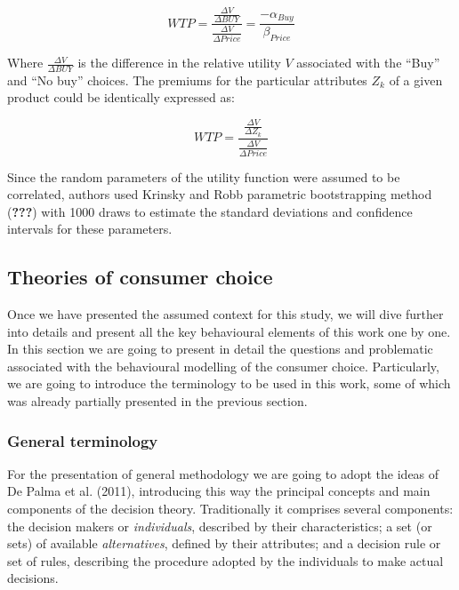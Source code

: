 \documentclass[11pt,]{article}
\begin{document}
\begin{equation}
WTP = \frac{
 \frac{\Delta V}{\Delta BUY}
}{
 \frac{\Delta V}{\Delta Price}
} = \frac{
  - \alpha_{Buy}
}{
  \beta_{Price}
}
\end{equation}

Where \(\frac{\Delta V}{\Delta BUY}\) is the difference in the relative
utility \(V\) associated with the ``Buy'' and ``No buy'' choices. The
premiums for the particular attributes \(Z_k\) of a given product could
be identically expressed as:

\begin{equation}
WTP = \frac{
 \frac{\Delta V}{\Delta Z_k}
}{
 \frac{\Delta V}{\Delta Price}
}
\end{equation}

Since the random parameters of the utility function were assumed to be
correlated, authors used Krinsky and Robb parametric bootstrapping
method ({\textbf{???}}) with 1000 draws to estimate the standard
deviations and confidence intervals for these parameters.

\hypertarget{theories-of-consumer-choice}{%
\subsection{Theories of consumer
choice}\label{theories-of-consumer-choice}}

Once we have presented the assumed context for this study, we will dive
further into details and present all the key behavioural elements of
this work one by one. In this section we are going to present in detail
the questions and problematic associated with the behavioural modelling
of the consumer choice. Particularly, we are going to introduce the
terminology to be used in this work, some of which was already partially
presented in the previous section.

\hypertarget{general-terminology}{%
\subsubsection{General terminology}\label{general-terminology}}

For the presentation of general methodology we are going to adopt the
ideas of De Palma et al. (2011), introducing this way the principal
concepts and main components of the decision theory. Traditionally it
comprises several components: the decision makers or \emph{individuals},
described by their characteristics; a set (or sets) of available
\emph{alternatives}, defined by their attributes; and a decision rule or
set of rules, describing the procedure adopted by the individuals to
make actual decisions.
\end{document}

